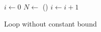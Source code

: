 \begin{figure}[t]
    \begin{algorithmic}
        \State $i \gets 0$
        \State $N \gets$ () 
        \State {}
        \State $i \gets i + 1$
        \EndWhile
    \end{algorithmic}
    \caption{Loop without constant bound}
    \label{fig:intro:unroll-nostatic-bound}
\end{figure}
